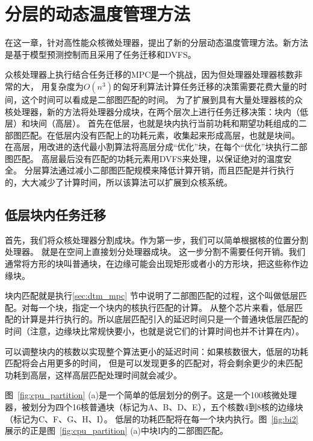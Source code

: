 
\chapter{分层的动态温度管理方法}\label{sec:new_method}

在这一章，针对高性能众核微处理器，提出了新的分层动态温度管理方法。新方法是基于模型预测控制而且采用了任务迁移和DVFS。

众核处理器上执行结合任务迁移的MPC是一个挑战，因为但处理器处理器核数非常的大，
用复杂度为$O(n^{3})$的匈牙利算法计算任务迁移的决策需要花费大量的时间，这个时间可以看成是二部图匹配的时间。
为了扩展到具有大量处理器核的众核处理器，新的方法将处理器分成块，在两个层次上进行任务迁移决策：块内（低层）和块间（高层）。
首先在低层，也就是块内执行当前功耗和期望功耗组成的二部图匹配。在低层内没有匹配上的功耗元素，收集起来形成高层，也就是块间。
在高层，用改进的迭代最小割算法将高层分成“优化”块，在每个“优化”块执行二部图匹配。
高层最后没有匹配的功耗元素用DVFS来处理，以保证绝对的温度安全。
分层算法通过减小二部图匹配规模来降低计算开销，而且匹配是并行执行的，大大减少了计算时间，所以该算法可以扩展到众核系统。

\section{低层块内任务迁移}\label{sec:parts}

首先，我们将众核处理器分割成块。作为第一步，我们可以简单根据核的位置分割处理器。
就是在空间上直接划分处理器成块。
这一步分割不需要任何开销。我们通常将方形的块叫普通块，在边缘可能会出现矩形或者小的方形块，把这些称作边缘块。

块内匹配就是执行\ref{sec:dtm_mpc} 节中说明了二部图匹配的过程，这个叫做低层匹配。对每一个块，指定一个块内的核执行匹配的计算。
从整个芯片来看，低层匹配的计算是并行执行的。所以底层匹配引入的延迟时间只是一个普通块低层匹配的时间（注意，边缘块比常规快要小，也就是说它们的计算时间也并不计算在内）。

可以调整块内的核数以实现整个算法更小的延迟时间：如果核数很大，低层的功耗匹配将会占用更多的时间，
但是可以发现更多的匹配对，将会剩余更少的未匹配功耗到高层，这样高层匹配处理时间就会减少。

图~\ref{fig:cpu_partition} (a)是一个简单的低层划分的例子。这是一个100核微处理器，被划分为四个16核普通块（标记为A、B、D、E），五个核数4到8核的边缘块（标记为C、F、G、H、I）。
低层的功耗匹配将在每一个块内执行。图~\ref{fig:bi2} 展示的正是图~\ref{fig:cpu_partition} (a)中块I内的二部图匹配。

